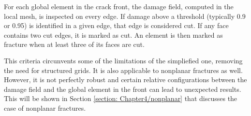 For each global element in the crack front, the damage field, computed in the local mesh, is inspected on every edge. If damage above a threshold (typically 0.9 or 0.95) is identified in a given edge, that edge is considered cut. If any face contains two cut edges, it is marked as cut. An element is then marked as fracture when at least three of its faces are cut.

This criteria circunvents some of the limitations of the simpliefied one, removing the need for structured grids. It is also applicable to nonplanar fractures as well. However, it is not perfectly robust and certain relative configurations between the damage field and the global element in the front can lead to unexpected results. This will be shown in Section \ref{section: Chapter4/nonplanar} that discusses the case of nonplanar fractures.


    


